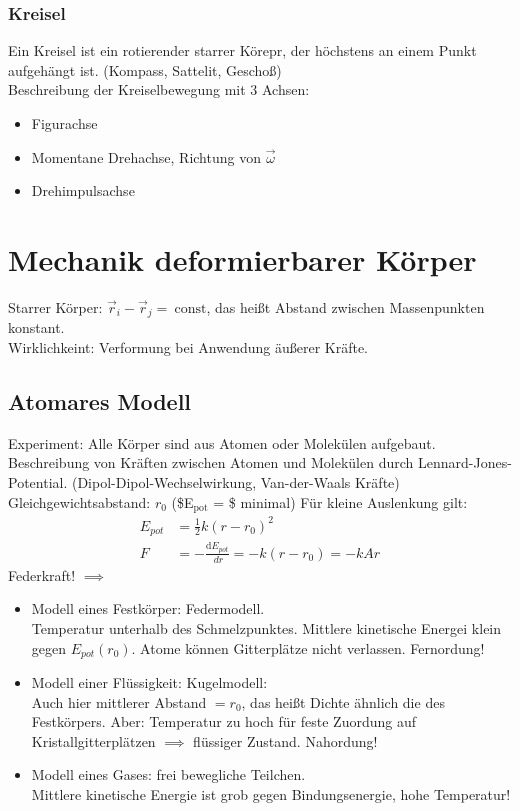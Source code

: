 \documentclass[a4paper]{scrartcl}
\renewcommand{\d}{\mathrm{d}}
\renewcommand{\v}[1]{\vec{#1}}
\newcommand{\dd}[2]{\frac{\d #1}{\ d#2}}
\theoremstyle{definition}
\theoremstyle{plain}
\theoremstyle{plain}
\theoremstyle{remark}
\theoremstyle{remark}
\theoremstyle{remark}
\begin{document}
\subsubsection{Kreisel}
\label{sec-8-8-1}
Ein Kreisel ist ein rotierender starrer Körepr, der höchstens an einem Punkt aufgehängt ist. (Kompass, Sattelit, Geschoß) \\
    Beschreibung der Kreiselbewegung mit 3 Achsen:
\begin{itemize}
\item Figurachse
\item Momentane Drehachse, Richtung von $\v \omega$
\item Drehimpulsachse
\end{itemize}
\section{Mechanik deformierbarer Körper}
\label{sec-9}
Starrer Körper: $\v r_i - \v r_j = ~\text{const}$, das heißt Abstand zwischen Massenpunkten konstant. \\
  Wirklichkeint: Verformung bei Anwendung äußerer Kräfte.
\subsection{Atomares Modell}
\label{sec-9-1}
Experiment: Alle Körper sind aus Atomen oder Molekülen aufgebaut.
Beschreibung von Kräften zwischen Atomen und Molekülen durch Lennard-Jones-Potential. (Dipol-Dipol-Wechselwirkung, Van-der-Waals Kräfte) \\
   Gleichgewichtsabstand: $r_0$ (\$E$_{\text{pot}}$ = \$ minimal)
Für kleine Auslenkung gilt:
\begin{align*}
E_{pot} &= \frac{1}{2}k(r - r_0)^2 \\
F &= -\dd{E_{pot}}{r} = -k(r - r_0) = -k Ar
\end{align*}
Federkraft!
$\implies$
\begin{itemize}
\item Modell eines Festkörper: Federmodell. \\
     Temperatur unterhalb des Schmelzpunktes. Mittlere kinetische Energei klein gegen $E_{pot}(r_0)$.
Atome können Gitterplätze nicht verlassen. Fernordung!
\item Modell einer Flüssigkeit: Kugelmodell: \\
     Auch hier mittlerer Abstand $= r_0$, das heißt Dichte ähnlich die des Festkörpers.
Aber: Temperatur zu hoch für feste Zuordung auf Kristallgitterplätzen $\implies$ flüssiger Zustand. Nahordung!
\item Modell eines Gases: frei bewegliche Teilchen. \\
     Mittlere kinetische Energie ist grob gegen Bindungsenergie, hohe Temperatur!
\end{itemize}
\end{document}

